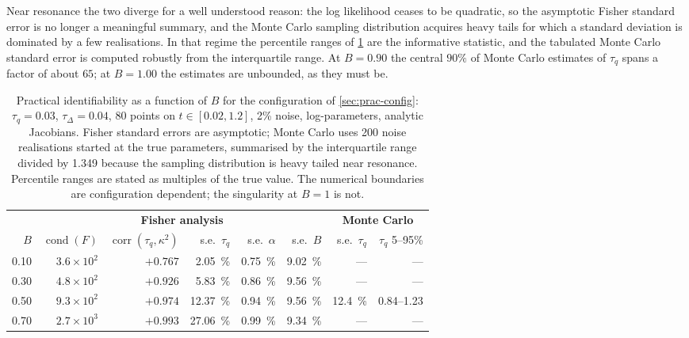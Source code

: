 \documentclass[preprint,12pt,a4paper]{elsarticle}
\theoremstyle{plain}
\theoremstyle{definition}
\theoremstyle{remark}
\newcommand{\tq}{\tau_{q}}
\newcommand{\kk}{\kappa^{2}}
\newcommand{\Bnum}{B}
\begin{document}
Near resonance the two diverge for a well understood reason: the log likelihood
ceases to be quadratic, so the asymptotic Fisher standard error is no longer a
meaningful summary, and the Monte Carlo sampling distribution acquires heavy
tails for which a standard deviation is dominated by a few realisations. In
that regime the percentile ranges of \cref{tab:identifiability} are the
informative statistic, and the tabulated Monte Carlo standard error is computed
robustly from the interquartile range. At $\Bnum = 0.90$ the central $90\%$ of
Monte Carlo estimates of $\tq$ spans a factor of about $65$; at
$\Bnum = 1.00$ the estimates are unbounded, as they must be.
\begin{table}[htbp]
  \centering
  \caption{Practical identifiability as a function of $\Bnum$ for the
           configuration of \cref{sec:prac-config}: $\tq=0.03$,
           $\tau_{\Delta}=0.04$, 80 points on $t\in[0.02,1.2]$, 2\% noise,
           log-parameters, analytic Jacobians. Fisher standard errors are
           asymptotic; Monte Carlo uses 200 noise realisations started at the
           true parameters, summarised by the interquartile range divided by
           1.349 because the sampling distribution is heavy tailed near
           resonance. Percentile ranges are stated as multiples of the
           true value. The numerical boundaries are configuration dependent;
           the singularity at $\Bnum=1$ is not.}
  \label{tab:identifiability}
  \scriptsize
  \begin{tabular}{@{}rrrrrrrr@{}}
    \toprule
    & \multicolumn{5}{c}{\textbf{Fisher analysis}}
    & \multicolumn{2}{c}{\textbf{Monte Carlo}} \\
    \cmidrule(lr){2-6}\cmidrule(lr){7-8}
    $\Bnum$ & $\operatorname{cond}(F)$ & $\operatorname{corr}(\tq,\kk)$ &
    s.e.\ $\tq$ & s.e.\ $\alpha$ & s.e.\ $\Bnum$ &
    s.e.\ $\tq$ & $\tq$ 5--95\% \\
    \midrule
    0.10 & $3.6\times10^{2}$  & $+0.767$ & \SI{2.05}{\percent}  & \SI{0.75}{\percent} & \SI{9.02}{\percent} & --- & --- \\
    0.30 & $4.8\times10^{2}$  & $+0.926$ & \SI{5.83}{\percent}  & \SI{0.86}{\percent} & \SI{9.56}{\percent} & --- & --- \\
    0.50 & $9.3\times10^{2}$  & $+0.974$ & \SI{12.37}{\percent} & \SI{0.94}{\percent} & \SI{9.56}{\percent} & \SI{12.4}{\percent} & 0.84--1.23 \\
    0.70 & $2.7\times10^{3}$  & $+0.993$ & \SI{27.06}{\percent} & \SI{0.99}{\percent} & \SI{9.34}{\percent} & --- & --- \\

\end{tabular}
\end{table}
\end{document}
